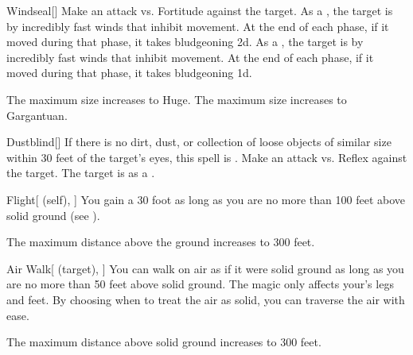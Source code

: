 \lowercase{\hypertarget{spell:Windseal}{}}\label{spell:Windseal}
\begin{freeability}[Rank 4]{\hypertarget{spell:Windseal}{Windseal}}[]
Make an attack vs. Fortitude against the target.
\hit As a , the target is  by incredibly fast winds that inhibit movement.
At the end of each phase, if it moved during that phase, it takes bludgeoning  \minus2d.
\crit As a , the target is  by incredibly fast winds that inhibit movement.
At the end of each phase, if it moved during that phase, it takes bludgeoning  \plus1d.

\rankline
{} The maximum size increases to Huge.
 The maximum size increases to Gargantuan.
\end{freeability}
\vspace{0.25em}



\lowercase{\hypertarget{spell:Dustblind}{}}\label{spell:Dustblind}
\begin{freeability}[Rank 5]{\hypertarget{spell:Dustblind}{Dustblind}}[]
If there is no dirt, dust, or collection of loose objects of similar size within 30 feet of the target's eyes, this spell is .
Make an attack vs. Reflex against the target.
\hit The target is  as a .
\end{freeability}
\vspace{0.25em}



\lowercase{\hypertarget{spell:Flight}{}}\label{spell:Flight}
\begin{attuneability}[Rank 5]{\hypertarget{spell:Flight}{Flight}}[ (self), ]
You gain a 30 foot  as long as you are no more than 100 feet above solid ground (see ).

\rankline
{} The maximum distance above the ground increases to 300 feet.
\end{attuneability}
\vspace{0.25em}



\lowercase{\hypertarget{spell:Air Walk}{}}\label{spell:Air Walk}
\begin{attuneability}[Rank 6]{\hypertarget{spell:Air Walk}{Air Walk}}[ (target), ]
You can walk on air as if it were solid ground as long as you are no more than 50 feet above solid ground.
The magic only affects your's legs and feet.
By choosing when to treat the air as solid, you can traverse the air with ease.

\rankline
{} The maximum distance above solid ground increases to 300 feet.
\end{attuneability}
\vspace{0.25em}



